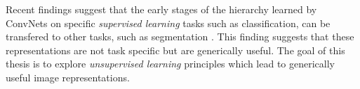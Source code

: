 Recent findings suggest that the early stages of the hierarchy learned by ConvNets 
on specific \emph{supervised learning} tasks such as classification, can be transfered 
to other tasks, such as segmentation \cite{yosinski2014}. This finding suggests 
that these representations are not task specific but are generically useful. 
The goal of this thesis is to explore \emph{unsupervised learning} principles which lead
to generically useful image representations.    







